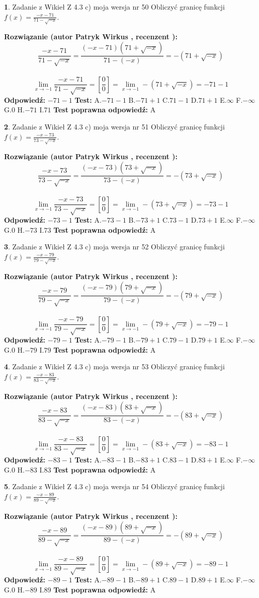 \documentclass[12pt, a4paper]{article}
\theoremstyle{definition} %
\newtheorem{zad}{}
\newcommand{\zadStart}[1]{\begin{zad}#1\newline}
\newcommand{\zadStop}{\end{zad}}
\newcommand{\rozwStart}[2]{\noindent \textbf{Rozwiązanie (autor #1 , recenzent #2): }\newline}
\newcommand{\rozwStop}{\newline}
\newcommand{\odpStart}{\noindent \textbf{Odpowiedź:}\newline}
\newcommand{\odpStop}{\newline}
\newcommand{\testStart}{\noindent \textbf{Test:}\newline}
\newcommand{\testStop}{\newline}
\newcommand{\kluczStart}{\noindent \textbf{Test poprawna odpowiedź:}\newline}
\newcommand{\kluczStop}{\newline}
\begin{document}
\zadStart{Zadanie z Wikieł Z 4.3 c) moja wersja nr 50}
Obliczyć granicę funkcji $f(x)=\frac{-x-71}{71-\sqrt{-x}}$.
\zadStop
\rozwStart{Patryk Wirkus}{}
$$\frac{-x-71}{71-\sqrt{-x}}=\frac{(-x-71)(71+\sqrt{-x})}{71-(-x)}=-(71+\sqrt{-x})$$
\\
$$\lim\limits_{x\to-1}\frac{-x-71}{71-\sqrt{-x}}=[\frac{0}{0}]=\lim\limits_{x\to-1}-(71+\sqrt{-x}) =-71-1$$
\rozwStop
\odpStart
$-71-1$
\odpStop
\testStart
A.$-71-1$
B.$-71+1$
C.$71-1$
D.$71+1$
E.$\infty$
F.$-\infty$
G.$0$
H.$-71$
I.$71$
\testStop
\kluczStart
A
\kluczStop



\zadStart{Zadanie z Wikieł Z 4.3 c) moja wersja nr 51}
Obliczyć granicę funkcji $f(x)=\frac{-x-73}{73-\sqrt{-x}}$.
\zadStop
\rozwStart{Patryk Wirkus}{}
$$\frac{-x-73}{73-\sqrt{-x}}=\frac{(-x-73)(73+\sqrt{-x})}{73-(-x)}=-(73+\sqrt{-x})$$
\\
$$\lim\limits_{x\to-1}\frac{-x-73}{73-\sqrt{-x}}=[\frac{0}{0}]=\lim\limits_{x\to-1}-(73+\sqrt{-x}) =-73-1$$
\rozwStop
\odpStart
$-73-1$
\odpStop
\testStart
A.$-73-1$
B.$-73+1$
C.$73-1$
D.$73+1$
E.$\infty$
F.$-\infty$
G.$0$
H.$-73$
I.$73$
\testStop
\kluczStart
A
\kluczStop



\zadStart{Zadanie z Wikieł Z 4.3 c) moja wersja nr 52}
Obliczyć granicę funkcji $f(x)=\frac{-x-79}{79-\sqrt{-x}}$.
\zadStop
\rozwStart{Patryk Wirkus}{}
$$\frac{-x-79}{79-\sqrt{-x}}=\frac{(-x-79)(79+\sqrt{-x})}{79-(-x)}=-(79+\sqrt{-x})$$
\\
$$\lim\limits_{x\to-1}\frac{-x-79}{79-\sqrt{-x}}=[\frac{0}{0}]=\lim\limits_{x\to-1}-(79+\sqrt{-x}) =-79-1$$
\rozwStop
\odpStart
$-79-1$
\odpStop
\testStart
A.$-79-1$
B.$-79+1$
C.$79-1$
D.$79+1$
E.$\infty$
F.$-\infty$
G.$0$
H.$-79$
I.$79$
\testStop
\kluczStart
A
\kluczStop



\zadStart{Zadanie z Wikieł Z 4.3 c) moja wersja nr 53}
Obliczyć granicę funkcji $f(x)=\frac{-x-83}{83-\sqrt{-x}}$.
\zadStop
\rozwStart{Patryk Wirkus}{}
$$\frac{-x-83}{83-\sqrt{-x}}=\frac{(-x-83)(83+\sqrt{-x})}{83-(-x)}=-(83+\sqrt{-x})$$
\\
$$\lim\limits_{x\to-1}\frac{-x-83}{83-\sqrt{-x}}=[\frac{0}{0}]=\lim\limits_{x\to-1}-(83+\sqrt{-x}) =-83-1$$
\rozwStop
\odpStart
$-83-1$
\odpStop
\testStart
A.$-83-1$
B.$-83+1$
C.$83-1$
D.$83+1$
E.$\infty$
F.$-\infty$
G.$0$
H.$-83$
I.$83$
\testStop
\kluczStart
A
\kluczStop



\zadStart{Zadanie z Wikieł Z 4.3 c) moja wersja nr 54}
Obliczyć granicę funkcji $f(x)=\frac{-x-89}{89-\sqrt{-x}}$.
\zadStop
\rozwStart{Patryk Wirkus}{}
$$\frac{-x-89}{89-\sqrt{-x}}=\frac{(-x-89)(89+\sqrt{-x})}{89-(-x)}=-(89+\sqrt{-x})$$
\\
$$\lim\limits_{x\to-1}\frac{-x-89}{89-\sqrt{-x}}=[\frac{0}{0}]=\lim\limits_{x\to-1}-(89+\sqrt{-x}) =-89-1$$
\rozwStop
\odpStart
$-89-1$
\odpStop
\testStart
A.$-89-1$
B.$-89+1$
C.$89-1$
D.$89+1$
E.$\infty$
F.$-\infty$
G.$0$
H.$-89$
I.$89$
\testStop
\kluczStart
A
\kluczStop
\end{document}

